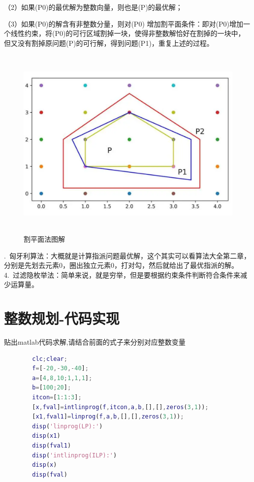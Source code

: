 \documentclass[a4paper,20pt]{article}
\begin{document}
\par \noindent（2）如果(P0)的最优解为整数向量，则也是(P)的最优解；

\par \noindent（3）如果(P0)的解含有非整数分量，则对(P0) 增加割平面条件：即对(P0)增加一个线性约束，将(P0)的可行区域割掉一块，使得非整数解恰好在割掉的一块中， 但又没有割掉原问题(P)的可行解，得到问题(P1)，重复上述的过程。
\begin{figure}[H]
    \centering
    \includegraphics[width=340pt,height=270pt]{figure2.png}
    \caption{割平面法图解}
\end{figure}
\par {}.~匈牙利算法：大概就是计算指派问题最优解，这个其实可以看算法大全第二章，分别是先划去元素0，圈出独立元素0，打对勾，然后就给出了最优指派的解。
\\4.~过滤隐枚举法：简单来说，就是穷举，但是要根据约束条件判断符合条件来减少运算量。
\section{整数规划-代码实现}
\par 贴出matlab代码求解,请结合前面的式子来分别对应整数变量
    \begin{center}
    \begin{lstlisting}[caption={INP},language=Matlab]
        % IntLinear Programming(ILP)
        clc;clear;
        f=[-20,-30,-40];
        a=[4,8,10;1,1,1];
        b=[100;20];
        itcon=[1:1:3];
        [x,fval]=intlinprog(f,itcon,a,b,[],[],zeros(3,1));
        [x1,fval1]=linprog(f,a,b,[],[],zeros(3,1));
        disp('linprog(LP):')
        disp(x1)
        disp(fval1)
        disp('intlinprog(ILP):')
        disp(x)
        disp(fval)
        \end{lstlisting}
    \end{center}
\end{document}
